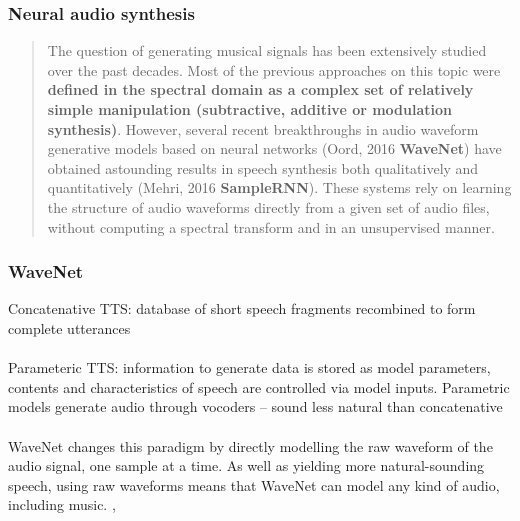 \documentclass{beamer}
\begin{document}

\begin{frame}
	\frametitle{Neural audio synthesis}
	\begin{quote}
		The question of generating musical signals has been extensively studied over the past decades. Most of the previous approaches on this topic were \textbf{defined in the spectral domain as a complex set of relatively simple manipulation (subtractive, additive or modulation synthesis)}. However, several recent breakthroughs in audio waveform generative models based on neural networks (Oord, 2016 \textbf{WaveNet}) have obtained astounding results in speech synthesis both qualitatively and quantitatively (Mehri, 2016 \textbf{SampleRNN}). These systems rely on learning the structure of audio waveforms directly from a given set of audio files, without computing a spectral transform and in an unsupervised manner.
	\end{quote}
\end{frame}


\begin{frame}
	\frametitle{WaveNet}
	Concatenative TTS: database of short speech fragments recombined to form complete utterances\\\ \\

	Parameteric TTS: information to generate data is stored as model parameters, contents and characteristics of speech are controlled via model inputs. Parametric models generate audio through vocoders -- sound less natural than concatenative\\\ \\

	WaveNet changes this paradigm by directly modelling the raw waveform of the audio signal, one sample at a time. As well as yielding more natural-sounding speech, using raw waveforms means that WaveNet can model any kind of audio, including music. , 
\end{frame}
\end{document}
